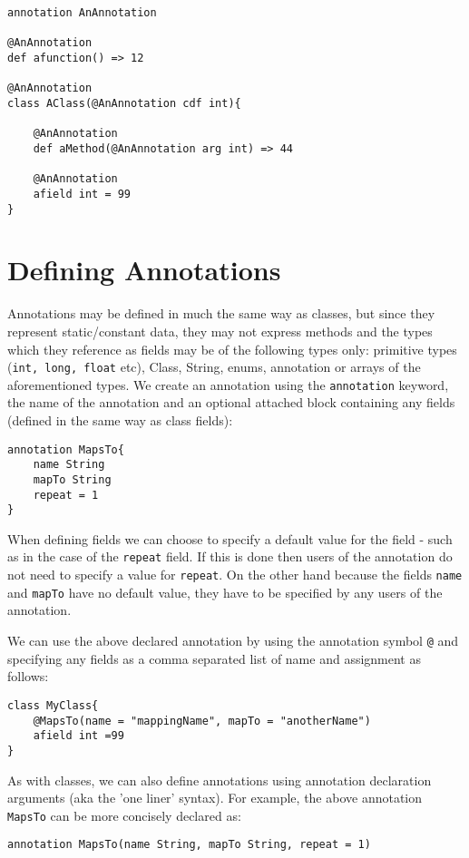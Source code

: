 \documentclass[conc-doc]{subfiles}
\begin{document}
\begin{lstlisting}
annotation AnAnnotation

@AnAnnotation
def afunction() => 12

@AnAnnotation
class AClass(@AnAnnotation cdf int){
	
	@AnAnnotation
	def aMethod(@AnAnnotation arg int) => 44
	
	@AnAnnotation
	afield int = 99
}
\end{lstlisting}

\section{Defining Annotations}
Annotations may be defined in much the same way as classes, but since they represent static/constant data, they may not express methods and the types which they reference as fields may be of the following types only: primitive types (\lstinline{int, long, float} etc), Class, String, enums, annotation or arrays of the aforementioned types. We create an annotation using the \lstinline{annotation} keyword, the name of the annotation and an optional attached block containing any fields (defined in the same way as class fields):

\begin{lstlisting}
annotation MapsTo{
	name String
	mapTo String
	repeat = 1
}
\end{lstlisting}

When defining fields we can choose to specify a default value for the field - such as in the case of the \lstinline{repeat} field. If this is done then users of the annotation do not need to specify a value for \lstinline{repeat}. On the other hand because the fields \lstinline{name} and \lstinline{mapTo} have no default value, they have to be specified by any users of the annotation.

We can use the above declared annotation by using the annotation symbol \lstinline{@} and specifying any fields as a comma separated list of name and assignment as follows:

\begin{lstlisting}
class MyClass{
	@MapsTo(name = "mappingName", mapTo = "anotherName")
	afield int =99
}
\end{lstlisting}

As with classes, we can also define annotations using annotation declaration arguments (aka the 'one liner' syntax). For example, the above annotation \lstinline{MapsTo} can be more concisely declared as:
\begin{lstlisting}
annotation MapsTo(name String, mapTo String, repeat = 1)
\end{lstlisting}
\end{document}
